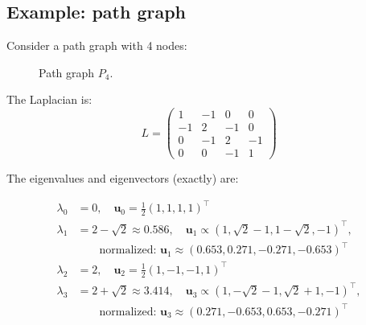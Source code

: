 \begin{notechapter}
\subsection{Example: path graph}

Consider a path graph with 4 nodes:

\begin{figure}[H]
\centering
{}
\caption{Path graph $P_4$.}
\end{figure}

The Laplacian is:
\begin{equation}
L = \begin{pmatrix}
1 & -1 & 0 & 0 \\
-1 & 2 & -1 & 0 \\
0 & -1 & 2 & -1 \\
0 & 0 & -1 & 1
\end{pmatrix}
\end{equation}

The eigenvalues and eigenvectors (exactly) are:

\begin{align*}
\lambda_0 &= 0, \quad \mathbf{u}_0 = \frac{1}{2}(1, 1, 1, 1)^\top \\
\lambda_1 &= 2 - \sqrt{2} \approx 0.586, \quad
           \mathbf{u}_1 \propto (1, \sqrt{2}-1, 1-\sqrt{2}, -1)^\top, \\ &\qquad\text{normalized: } \mathbf{u}_1 \approx (0.653, 0.271, -0.271, -0.653)^\top \\
\lambda_2 &= 2, \quad \mathbf{u}_2 = \frac{1}{2}(1, -1, -1, 1)^\top \\
\lambda_3 &= 2 + \sqrt{2} \approx 3.414, \quad
           \mathbf{u}_3 \propto (1, -\sqrt{2}-1, \sqrt{2}+1, -1)^\top, \\ &\qquad\text{normalized: } \mathbf{u}_3 \approx (0.271, -0.653, 0.653, -0.271)^\top
\end{align*}

\begin{figure}[H]
\centering
{}
\end{figure}
\end{notechapter}
